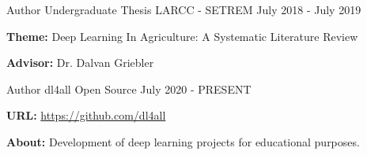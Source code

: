 
\begin{cventries}
	\cventry
	{Author} %
	{Undergraduate Thesis} %
	{LARCC - SETREM} %
	{July 2018 - July 2019} %
	{
		\begin{cvitems} %
			\item {\textbf{Theme:} Deep Learning In Agriculture: A Systematic Literature Review}
			\item {\textbf{Advisor:} Dr. Dalvan Griebler}
		\end{cvitems}
	}

	\cventry
	{Author} %
	{dl4all} %
	{Open Source} %
	{July 2020 - PRESENT} %
	{
		\begin{cvitems} %
			\item {\textbf{URL:} \href{https://github.com/dl4all}{https://github.com/dl4all}}
			\item {\textbf{About:} Development of deep learning projects for educational purposes.}
		\end{cvitems}
	}
\end{cventries}
